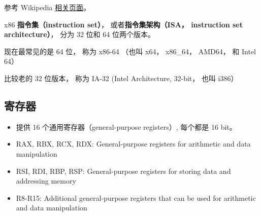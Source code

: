 
\begin{issues}
\issueDraft
\end{issues}

参考 Wikipedia \href{https://en.wikipedia.org/wiki/X86-64}{相关页面}。

x86 \textbf{指令集（instruction set）}， 或者\textbf{指令集架构（ISA， instruction set architecture）}， 分为 32 位和 64 位两个版本。

现在最常见的是 64 位， 称为 x86-64 （也叫 x64， x86_64， AMD64， 和 Intel 64）

比较老的 32 位版本， 称为 IA-32 (Intel Architecture, 32-bit， 也叫 i386）


\subsection{寄存器}
\begin{itemize}
\item 提供 16 个通用寄存器（general-purpose registers）, 每个都是 16 bit。
\item RAX, RBX, RCX, RDX: General-purpose registers for arithmetic and data manipulation
\item RSI, RDI, RBP, RSP: General-purpose registers for storing data and addressing memory
\item R8-R15: Additional general-purpose registers that can be used for arithmetic and data manipulation
\end{itemize}
